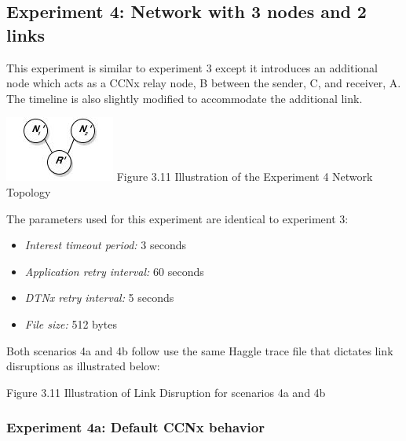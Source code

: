 \documentclass[a4paper,12pt]{report}      %
\begin{document}
\subsection{Experiment 4: Network with 3 nodes and 2 links}

This experiment is similar to experiment 3 except it introduces an additional node which acts as a
CCNx relay node, B between the sender, C, and receiver, A. The timeline is also slightly modified to
accommodate the additional link. %


\begin{center}
\includegraphics[scale=0.75]{exp4topo.jpg}\newline
Figure 3.11 Illustration of the Experiment 4 Network Topology  %
\end{center}

\noindent The parameters used for this experiment are identical to experiment 3:
\begin{itemize}
\item \textsl{Interest timeout period:} 3 seconds
\item \textsl{Application retry interval:} 60 seconds
\item \textsl{DTNx retry interval:} 5 seconds
\item \textsl{File size:} 512 bytes
\end{itemize}

\noindent Both scenarios 4a and 4b follow use the same Haggle trace file that dictates link disruptions as illustrated below:

\begin{center}Figure 3.11 Illustration of Link Disruption for scenarios 4a and 4b\end{center}

\subsubsection{Experiment 4a: Default CCNx behavior}

\end{document}
